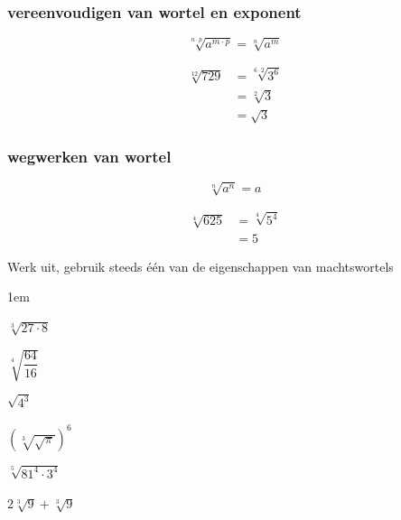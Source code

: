\documentclass[12pt,twoside,a4paper]{article}
\begin{document}
\subsubsection*{vereenvoudigen van wortel en exponent}
\begin{mdframed}
$$\sqrt[n\cdot p]{a^{m\cdot p}} = \sqrt[n]{a^m}$$
\end{mdframed}
\begin{align*}
  \sqrt[12]{729} &= \sqrt[6 \cdot 2]{3^6}\\
                 &= \sqrt[2]{3}\\
                 &= \sqrt{3}
\end{align*}

\subsubsection*{wegwerken van wortel}
\begin{mdframed}
$$\sqrt[n]{a^n} = a$$
\end{mdframed}
\begin{align*}
  \sqrt[4]{625} &= \sqrt[4]{5^4}\\
                 &= 5
\end{align*}


\begin{oefening}
  Werk uit, gebruik steeds één van de eigenschappen van machtswortels
  \begin{exlist}{3}
    \itemsep1em
  \item $\sqrt[3]{27\cdot 8}$
  \item $\sqrt[4]{\dfrac{64}{16}}$
  \item $\sqrt{4^3}$
  \item $\left(\sqrt[3]{\sqrt{\pi}}\right)^6$
  \item $\sqrt[5]{81^4\cdot 3^4}$
  \item $2\sqrt[3]{9}+ \sqrt[3]{9}$
  \end{exlist}
\end{oefening}
\end{document}
